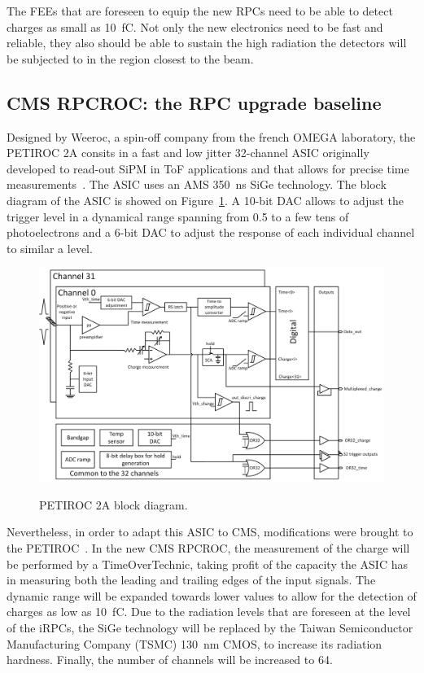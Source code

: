 	The FEEs that are foreseen to equip the new RPCs need to be able to detect charges as small as \SI{10}{fC}. Not only the new electronics need to be fast and reliable, they also should be able to sustain the high radiation the detectors will be subjected to in the region closest to the beam.
	
	\subsection{CMS RPCROC: the RPC upgrade baseline}
	\label{chapt6:ssec:RPCROC}
	
	Designed by Weeroc, a spin-off company from the french OMEGA laboratory, the PETIROC 2A consits in a fast and low jitter 32-channel ASIC originally developed to read-out \acf{SiPM} in ToF applications and that allows for precise time measurements~\cite{PETIROCIEEE,PETIROCTWEPP}. The ASIC uses an AMS \SI{350}{ns} SiGe technology. The block diagram of the ASIC is showed on Figure~\ref{fig:PETIROCASIC}. A 10-bit DAC allows to adjust the trigger level in a dynamical range spanning from 0.5 to a few tens of photoelectrons and a 6-bit DAC to adjust the response of each individual channel to similar a level.
	
	\begin{figure}[H]
		\centering
		\includegraphics[width = \linewidth]{fig/chapt6/petiroc2.png}\\
		\caption{\label{fig:PETIROCASIC} PETIROC 2A block diagram.}
	\end{figure}
	
	Nevertheless, in order to adapt this ASIC to CMS, modifications were brought to the PETIROC~\cite{PHASEIITP}. In the new CMS RPCROC, the measurement of the charge will be performed by a TimeOverTechnic, taking profit of the capacity the ASIC has in measuring both the leading and trailing edges of the input signals. The dynamic range will be expanded towards lower values to allow for the detection of charges as low as \SI{10}{fC}. Due to the radiation levels that are foreseen at the level of the iRPCs, the SiGe technology will be replaced by the Taiwan Semiconductor Manufacturing Company (TSMC) \SI{130}{nm} CMOS, to increase its radiation hardness. Finally, the number of channels will be increased to 64.
	
